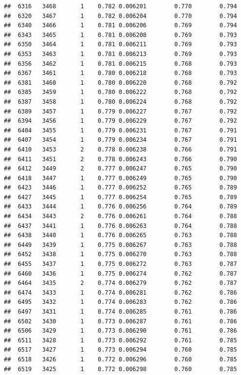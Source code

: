 \documentclass[
]{book}
\begin{document}
\begin{verbatim}
##  6316   3468       1    0.782 0.006201        0.770        0.794
##  6320   3467       1    0.782 0.006204        0.770        0.794
##  6340   3466       1    0.781 0.006206        0.769        0.794
##  6343   3465       1    0.781 0.006208        0.769        0.793
##  6350   3464       1    0.781 0.006211        0.769        0.793
##  6353   3463       1    0.781 0.006213        0.769        0.793
##  6356   3462       1    0.781 0.006215        0.768        0.793
##  6367   3461       1    0.780 0.006218        0.768        0.793
##  6381   3460       1    0.780 0.006220        0.768        0.792
##  6385   3459       1    0.780 0.006222        0.768        0.792
##  6387   3458       1    0.780 0.006224        0.768        0.792
##  6389   3457       1    0.779 0.006227        0.767        0.792
##  6394   3456       1    0.779 0.006229        0.767        0.792
##  6404   3455       1    0.779 0.006231        0.767        0.791
##  6407   3454       1    0.779 0.006234        0.767        0.791
##  6410   3453       2    0.778 0.006238        0.766        0.791
##  6411   3451       2    0.778 0.006243        0.766        0.790
##  6412   3449       2    0.777 0.006247        0.765        0.790
##  6418   3447       1    0.777 0.006249        0.765        0.790
##  6423   3446       1    0.777 0.006252        0.765        0.789
##  6427   3445       1    0.777 0.006254        0.765        0.789
##  6433   3444       1    0.776 0.006256        0.764        0.789
##  6434   3443       2    0.776 0.006261        0.764        0.788
##  6437   3441       1    0.776 0.006263        0.764        0.788
##  6438   3440       1    0.776 0.006265        0.763        0.788
##  6449   3439       1    0.775 0.006267        0.763        0.788
##  6452   3438       1    0.775 0.006270        0.763        0.788
##  6455   3437       1    0.775 0.006272        0.763        0.787
##  6460   3436       1    0.775 0.006274        0.762        0.787
##  6464   3435       2    0.774 0.006279        0.762        0.787
##  6474   3433       1    0.774 0.006281        0.762        0.786
##  6495   3432       1    0.774 0.006283        0.762        0.786
##  6497   3431       1    0.774 0.006285        0.761        0.786
##  6502   3430       1    0.773 0.006287        0.761        0.786
##  6506   3429       1    0.773 0.006290        0.761        0.786
##  6511   3428       1    0.773 0.006292        0.761        0.785
##  6517   3427       1    0.773 0.006294        0.760        0.785
##  6518   3426       1    0.772 0.006296        0.760        0.785
##  6519   3425       1    0.772 0.006298        0.760        0.785

\end{verbatim}
\end{document}
